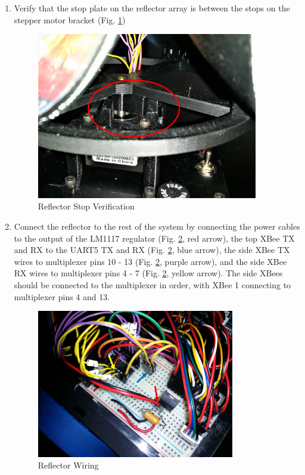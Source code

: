\begin{enumerate}[label = \textbf{Step \arabic*.}]
    \item Verify that the stop plate on the reflector array is between the stops on the stepper motor bracket (Fig. \ref{fig:installedReflector})
    \begin{figure}[H]
        \centering
        \includegraphics[width=3.8in]{figs/img/assembly/29-installedReflector.png}
        \caption{Reflector Stop Verification}
        \label{fig:installedReflector}
    \end{figure}
    \pagebreak

    \item Connect the reflector to the rest of the system by connecting the power cables to the output of the LM1117 regulator (Fig. \ref{fig:reflectorWiring}, red arrow), the top XBee TX and RX to the UART5 TX and RX (Fig. \ref{fig:reflectorWiring}, blue arrow), the side XBee TX wires to multiplexer pins 10 - 13 (Fig. \ref{fig:reflectorWiring}, purple arrow), and the side XBee RX wires to multiplexer pins 4 - 7 (Fig. \ref{fig:reflectorWiring}, yellow arrow). The side XBees should be connected to the multiplexer in order, with XBee 1 connecting to multiplexer pins 4 and 13.
    \begin{figure}[H]
        \centering
        \includegraphics[width=3.4in]{figs/img/assembly/30-reflectorWiring.png}
        \caption{Reflector Wiring}
        \label{fig:reflectorWiring}
    \end{figure}
\end{enumerate}

